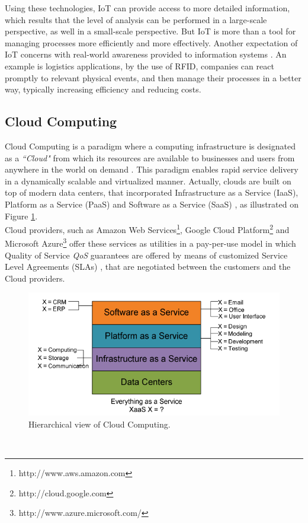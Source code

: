 Using these technologies, IoT can provide access to more detailed information, which results
that the level of analysis can be performed in a large-scale perspective, as well in a
small-scale perspective. But IoT is more than a tool for managing processes more
efficiently and more effectively. Another expectation of IoT concerns with real-world
awareness provided to information systems \cite{mattern2010internet}. An example is logistics
applications, by the use of RFID, companies can react promptly to relevant physical events,
and then manage their processes in a better way, typically increasing efficiency and
reducing costs.

\subsection{Cloud Computing}
\label{sub:cloud_computing}
Cloud Computing is a paradigm where a computing infrastructure is designated as a \textit{``Cloud"}
from which its resources are available to businesses and users from anywhere in the
world on demand \cite{buyya2009cloud}. This paradigm enables rapid service delivery in
a dynamically scalable and virtualized manner. Actually, clouds are built on top of
modern data centers, that incorporated Infrastructure as a Service (IaaS), Platform as a Service (PaaS)
and Software as a Service (SaaS) \cite{tsai2010service}, as illustrated on Figure \ref{fig:high_level_cloud_view}.\\

Cloud providers, such as Amazon Web Services\footnote{http://www.aws.amazon.com},
Google Cloud Platform\footnote{http://cloud.google.com} and Microsoft Azure\footnote{http://www.azure.microsoft.com/}
offer these services as utilities in a pay-per-use model in which Quality of Service \textit{QoS}
guarantees are offered by means of customized Service Level Agreements (SLAs) \cite{vaquero2008break},
that are negotiated between the customers and the Cloud providers.
\begin{figure}[h!]
  \centering
  \includegraphics[width=.8\textwidth]{./images/high_level_cloud_view}
  \caption{Hierarchical view of Cloud Computing.}
  \label{fig:high_level_cloud_view}
\end{figure}\\

